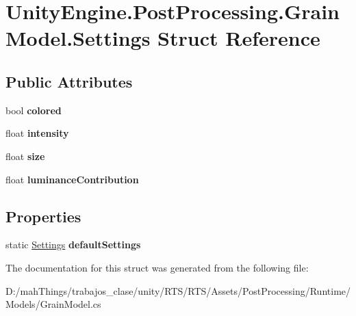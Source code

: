 \hypertarget{struct_unity_engine_1_1_post_processing_1_1_grain_model_1_1_settings}{}\section{Unity\+Engine.\+Post\+Processing.\+Grain\+Model.\+Settings Struct Reference}
\label{struct_unity_engine_1_1_post_processing_1_1_grain_model_1_1_settings}
\subsection*{Public Attributes}
\begin{DoxyCompactItemize}
\item 
\mbox{\label{struct_unity_engine_1_1_post_processing_1_1_grain_model_1_1_settings_aad04a9e0e2a4e76a4d039aef0b510dd7}} 
bool {\bfseries colored}
\item 
\mbox{\label{struct_unity_engine_1_1_post_processing_1_1_grain_model_1_1_settings_ae696f9b4163df03b17d1f1d824ece3e2}} 
float {\bfseries intensity}
\item 
\mbox{\label{struct_unity_engine_1_1_post_processing_1_1_grain_model_1_1_settings_a781cd0e3020f79f79b17e17ebb2bca57}} 
float {\bfseries size}
\item 
\mbox{\label{struct_unity_engine_1_1_post_processing_1_1_grain_model_1_1_settings_ac063b9210d784f1f79192e23a945cfed}} 
float {\bfseries luminance\+Contribution}
\end{DoxyCompactItemize}
\subsection*{Properties}
\begin{DoxyCompactItemize}
\item 
\mbox{\label{struct_unity_engine_1_1_post_processing_1_1_grain_model_1_1_settings_a8df6cd9a36238511c92646fe1b9e86bc}} 
static \mbox{\hyperlink{struct_unity_engine_1_1_post_processing_1_1_grain_model_1_1_settings}{Settings}} {\bfseries default\+Settings}
\end{DoxyCompactItemize}


The documentation for this struct was generated from the following file\+:\begin{DoxyCompactItemize}
\item 
D\+:/mah\+Things/trabajos\+\_\+clase/unity/\+R\+T\+S/\+R\+T\+S/\+Assets/\+Post\+Processing/\+Runtime/\+Models/Grain\+Model.\+cs\end{DoxyCompactItemize}
